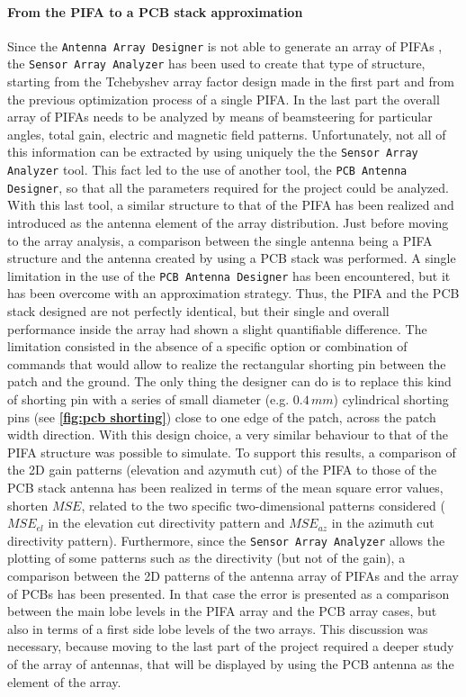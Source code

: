 \documentclass[12pt,a4paper,twocolumn]{article}
\begin{document}
{	\paragraph{\selectfont\color{Turquoise}From the PIFA to a PCB stack approximation}
Since the \texttt{\color{Mahogany}Antenna Array Designer} is not able to generate an array of PIFAs , the \texttt{\color{Mahogany}Sensor Array Analyzer} has been used to create that type of structure, starting from the Tchebyshev array factor design made in the first part and from the previous optimization process of a single PIFA. In the last part the overall array of PIFAs needs to be analyzed by means of beamsteering for particular angles, total gain, electric and magnetic field patterns. Unfortunately, not all of this information can be extracted by using uniquely the the \texttt{\color{Mahogany}Sensor Array Analyzer} tool. This fact led to the use of another tool, the \texttt{\color{Mahogany}PCB Antenna Designer}, so that all the parameters required for the project could be analyzed. With this last tool, a similar structure to that of the PIFA has been realized and introduced as the antenna element of the array distribution. Just before moving to the array analysis, a comparison between the single antenna being a PIFA structure and the antenna created by using a PCB stack was performed. A single limitation in the use of the \texttt{\color{Mahogany}PCB Antenna Designer} has been encountered, but it has been overcome with an approximation strategy. Thus, the PIFA and the PCB stack designed are not perfectly identical, but their single and overall performance inside the array had shown a slight quantifiable difference. The limitation consisted in the absence of a specific option or combination of commands that would allow to realize the rectangular shorting pin between the patch and the ground. The only thing the designer can do is to replace this kind of shorting pin with a series of small diameter (e.g. $0.4\,mm$) cylindrical shorting pins (see \textbf{\cref{fig:pcb shorting}}) close to one edge of the patch, across the patch width direction. With this design choice, a very similar behaviour to that of the PIFA structure was possible to simulate. To support this results, a comparison of the 2D gain patterns (elevation and azymuth cut) of the PIFA to those of the PCB stack antenna has been realized in terms of the mean square error values, shorten $MSE$, related to the two specific two-dimensional patterns considered ($MSE_{el}$ in the elevation cut directivity pattern and $MSE_{az}$ in the azimuth cut directivity pattern). Furthermore, since the \texttt{\color{Mahogany}Sensor Array Analyzer} allows the plotting of some patterns such as the directivity (but not of the gain), a comparison between the 2D patterns of the antenna array of PIFAs and the array of PCBs has been presented. In that case the error is presented as a comparison between the main lobe levels in the PIFA array and the PCB array cases, but also in terms of a first side lobe levels of the two arrays. This discussion was necessary, because moving to the last part of the project required a deeper study of the array of antennas, that will be displayed by using the PCB antenna as the element of the array. 

}
\end{document}
